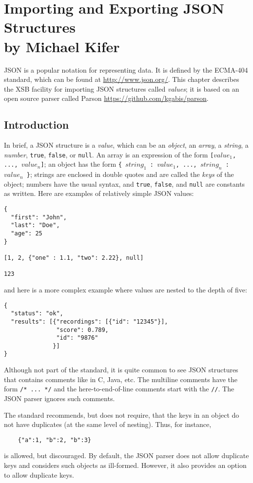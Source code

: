 \chapter[Importing JSON Structures] 
{Importing and Exporting JSON Structures\\
  {\Large by Michael Kifer}} \label{chap:json}

JSON is a popular notation for representing data. It is defined
by the ECMA-404 standard, which can be found at \url{http://www.json.org/}.
This chapter describes the XSB facility for importing JSON structures
called \emph{values}; it is based on an open source parser called Parson
\url{https://github.com/kgabis/parson}.

\section{Introduction}

In brief, a JSON structure is a \emph{value}, which can be
an \emph{object}, an
\emph{array}, a \emph{string}, a \emph{number},  \texttt{true}, \texttt{false},
or \texttt{null}. An array is an expression of the form
\texttt{[$value_1$, ..., $value_n$]}; an object has the form
\texttt{\{ $string_1$ : $value_1$,  ..., $string_n$ : $value_n$
  \}}; strings are enclosed in double quotes and are called the \emph{keys}
of the object; numbers have the usual
syntax, and \texttt{true}, \texttt{false}, and \texttt{null} are constants
as written. Here are examples of relatively simple JSON values:
\begin{verbatim}
{
  "first": "John",
  "last": "Doe",
  "age": 25
}

[1, 2, {"one" : 1.1, "two": 2.22}, null]

123
\end{verbatim}
and here is a more complex example where values are nested to the depth of
five:
\begin{verbatim}
{
  "status": "ok",
  "results": [{"recordings": [{"id": "12345"}],
               "score": 0.789,
               "id": "9876"
              }]
}
\end{verbatim}

Although not part of the standard, it is quite common to see JSON
structures that contains comments like in C, Java, etc. The multiline
comments have the form \texttt{/* ... */} and the here-to-end-of-line
comments start with the \texttt{//}. The JSON parser ignores such comments.

The standard recommends, but does not require, that the keys in an object
do not have duplicates (at the same level of nesting). Thus, for instance,
\begin{verbatim}
    {"a":1, "b":2, "b":3}
\end{verbatim}
is allowed, but discouraged. By default, the JSON parser does not allow
duplicate keys and considers such objects as ill-formed. However, it also
provides an option to allow duplicate keys.


